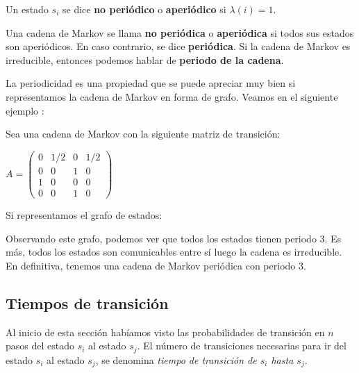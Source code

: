 \begin{definition}
Un estado $s_i$ se dice \textbf{no periódico} o \textbf{aperiódico} si $\lambda(i)=1$. 
\end{definition}
\begin{definition}
Una cadena de Markov se llama \textbf{no periódica} o \textbf{aperiódica} si todos sus estados son aperiódicos. En caso contrario, se dice \textbf{periódica}. Si la cadena de Markov es irreducible, entonces podemos hablar de \textbf{periodo de la cadena}.
\end{definition}
La periodicidad es una propiedad que se puede apreciar muy bien si representamos la cadena de Markov en forma de grafo. Veamos en el siguiente ejemplo \cite[Página 16]{JuanM}:
\begin{exampleth}
Sea una cadena de Markov con la siguiente matriz de transición:
\begin{center}
    $A=\begin{pmatrix}
    0 & 1/2 & 0 & 1/2 \\
    0 & 0 & 1 & 0 \\
    1 & 0 & 0 & 0 \\
    0 & 0 & 1 & 0
    \end{pmatrix}$
\end{center}
Si representamos el grafo de estados:
    \begin{center}
    \end{center}
Observando este grafo, podemos ver que todos los estados tienen periodo 3. Es más, todos los estados son comunicables entre sí luego la cadena es irreducible. En definitiva, tenemos una cadena de Markov periódica con periodo 3.
\end{exampleth}

\subsection{Tiempos de transición}
Al inicio de esta sección habíamos visto las probabilidades de transición en $n$ pasos del estado $s_i$ al estado $s_j$. El número de transiciones necesarias para ir del estado $s_i$ al estado $s_j$, se denomina \textit{tiempo de transición de $s_i$ hasta $s_j$}.

